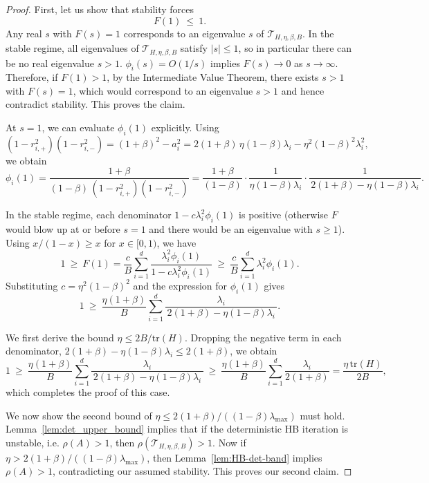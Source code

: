 \documentclass{article}
\begin{document}
\begin{proof}
First, let us show that stability forces
\[
F(1)\ \le\ 1.
\]
Any real $s$ with $F(s)=1$ corresponds to an
eigenvalue $s$ of $\mathcal{T}_{H,\eta,\beta,B}$.
In the stable regime, all eigenvalues of $\mathcal{T}_{H,\eta,\beta,B}$
satisfy $|s|\le 1$, so in particular there can be no real eigenvalue
$s>1$. 
$\phi_i(s)=O(1/s)$ implies $F(s)\to 0$ as $s\to\infty$. Therefore, if $F(1)>1$, by the Intermediate Value Theorem, there exists $s>1$ with $F(s)=1$, which would correspond to an eigenvalue $s>1$ and hence contradict
stability. This proves the claim.

At $s=1$, we can evaluate $\phi_i(1)$ explicitly. Using
\[
(1-r_{i,+}^2)(1-r_{i,-}^2)
=(1+\beta)^2-a_i^2
=2(1+\beta)\,\eta(1-\beta)\lambda_i-\eta^2(1-\beta)^2\lambda_i^2,
\]
we obtain
\[
\phi_i(1)
=\frac{1+\beta}{(1-\beta)\,(1-r_{i,+}^2)(1-r_{i,-}^2)}
=\frac{1+\beta}{(1-\beta)}\cdot
\frac{1}{\eta(1-\beta)\lambda_i}\cdot
\frac{1}{\,2(1+\beta)-\eta(1-\beta)\lambda_i\,}.
\]

In the stable regime, each denominator $1-c\lambda_i^2\phi_i(1)$ is
positive (otherwise $F$ would blow up at or before $s=1$ and there
would be an eigenvalue with $s\ge 1$). Using
$x/(1-x)\ge x$ for $x\in[0,1)$, we have
\[
1 \ \ge\ F(1)
= \frac{c}{B}\sum_{i=1}^d \frac{\lambda_i^2\phi_i(1)}{1- c\lambda_i^2\phi_i(1)}
\ \ge\ \frac{c}{B}\sum_{i=1}^d \lambda_i^2\phi_i(1).
\]
Substituting $c=\eta^2(1-\beta)^2$ and the expression for $\phi_i(1)$
gives
\begin{equation}
\label{eq:edge-ineq-simplified}
1 \ \ge\ \frac{\eta(1+\beta)}{B}
\sum_{i=1}^d
\frac{\lambda_i}{\,2(1+\beta)-\eta(1-\beta)\lambda_i\,}.
\end{equation}

We first derive the bound $\eta \le 2B/\mathrm{tr}(H)$.
Dropping the negative term in each denominator,
$2(1+\beta)-\eta(1-\beta)\lambda_i \le 2(1+\beta)$, we obtain
\[
1
\ \ge\ \frac{\eta(1+\beta)}{B}
\sum_{i=1}^d
\frac{\lambda_i}{\,2(1+\beta)-\eta(1-\beta)\lambda_i\,}
\ \ge\ \frac{\eta(1+\beta)}{B}
\sum_{i=1}^d \frac{\lambda_i}{2(1+\beta)}
= \frac{\eta\,\mathrm{tr}(H)}{2B},
\]
which completes the proof of this case.


We now show the second bound of
$\eta \le 2(1+\beta)/((1-\beta)\lambda_{\max})$ must hold.
Lemma~\ref{lem:det_upper_bound} implies that if the
deterministic HB iteration is unstable, i.e. $\rho(A)>1$, then
$\rho(\mathcal{T}_{H,\eta,\beta,B})>1$. Now if $\eta >
2(1+\beta)/((1-\beta)\lambda_{\max})$, then Lemma~\ref{lem:HB-det-band}
implies $\rho(A)>1$, contradicting our
assumed stability. This proves our second claim.
\end{proof}
\end{document}
